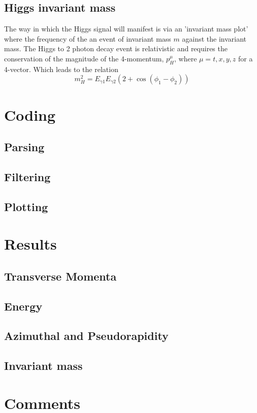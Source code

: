 \documentclass{article}
\begin{document}
\subsection{Higgs invariant mass}
The way in which the Higgs signal will manifest is via an 'invariant mass plot' where the frequency of the an event of invariant mass $m$ against the invariant mass. 
The Higgs to 2 photon decay event is relativistic and requires the conservation of the magnitude of the 4-momentum, $p_H^\mu$, where $\mu = t, x, y, z$ for a 4-vector. Which leads to the relation
\begin{equation}
m_H^2 = E_{\gamma 1} E_{\gamma 2} (2 + \cos(\phi_1 - \phi_2)) 
\end{equation}
\section{Coding}
\subsection{Parsing}
\subsection{Filtering}
\subsection{Plotting}
\section{Results}
\subsection{Transverse Momenta}
\subsection{Energy}
\subsection{Azimuthal and Pseudorapidity}
\subsection{Invariant mass}
\section{Comments}
\end{document}
